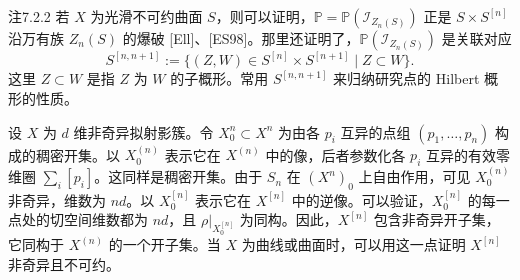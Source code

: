 \begin{origstatement}{注}{7.2.2}\label{ch07:7.2.2}
若 $X$ 为光滑不可约曲面 $S$，则可以证明，$\mathbb P=\mathbb P(\mathcal I_{Z_n(S)})$ 正是 $S\times S^{[n]}$ 沿万有族 $Z_n(S)$ 的爆破 [Ell]、[ES98]。那里还证明了，$\mathbb P(\mathcal I_{Z_n(S)})$ 是关联对应
\[
S^{[n,n+1]}:=\{(Z,W)\in S^{[n]}\times S^{[n+1]}\mid Z\subset W\}.
\]
这里 $Z\subset W$ 是指 $Z$ 为 $W$ 的子概形。常用 $S^{[n,n+1]}$ 来归纳研究点的 Hilbert 概形的性质。
\end{origstatement}
设 $X$ 为 $d$ 维非奇异拟射影簇。令 $X_0^n\subset X^n$ 为由各 $p_i$ 互异的点组 $(p_1,\ldots,p_n)$ 构成的稠密开集。以 $X_0^{(n)}$ 表示它在 $X^{(n)}$ 中的像，后者参数化各 $p_i$ 互异的有效零维圈 $\sum_i[p_i]$。这同样是稠密开集。由于 $S_n$ 在 $(X^n)_0$ 上自由作用，可见 $X_0^{(n)}$ 非奇异，维数为 $nd$。以 $X_0^{[n]}$ 表示它在 $X^{[n]}$ 中的逆像。可以验证，$X_0^{[n]}$ 的每一点处的切空间维数都为 $nd$，且 $\rho|_{X_0^{[n]}}$ 为同构。因此，$X^{[n]}$ 包含非奇异开子集，它同构于 $X^{(n)}$ 的一个开子集。当 $X$ 为曲线或曲面时，可以用这一点证明 $X^{[n]}$ 非奇异且不可约。

